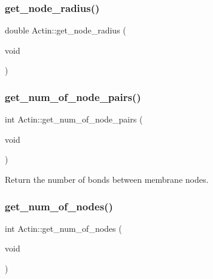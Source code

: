 \mbox{\label{classActin_a4180755ec60e5d39f7399f80270bed1d}} 
\subsubsection{\texorpdfstring{get\_node\_radius()}{get\_node\_radius()}}
{\footnotesize\ttfamily double Actin\+::get\+\_\+node\+\_\+radius (\begin{DoxyParamCaption}\item[{void}]{ }\end{DoxyParamCaption})\hspace{0.3cm}{\ttfamily [inline]}}

\mbox{\label{classActin_aab2351fd842efa6127dda490cb1cdbd3}} 
\subsubsection{\texorpdfstring{get\_num\_of\_node\_pairs()}{get\_num\_of\_node\_pairs()}}
{\footnotesize\ttfamily int Actin\+::get\+\_\+num\+\_\+of\+\_\+node\+\_\+pairs (\begin{DoxyParamCaption}\item[{void}]{ }\end{DoxyParamCaption})\hspace{0.3cm}{\ttfamily [inline]}}

Return the number of bonds between membrane nodes. \mbox{\label{classActin_a342dea409f97480770a7847533d6516c}} 
\subsubsection{\texorpdfstring{get\_num\_of\_nodes()}{get\_num\_of\_nodes()}}
{\footnotesize\ttfamily int Actin\+::get\+\_\+num\+\_\+of\+\_\+nodes (\begin{DoxyParamCaption}\item[{void}]{ }\end{DoxyParamCaption})\hspace{0.3cm}{\ttfamily [inline]}}



